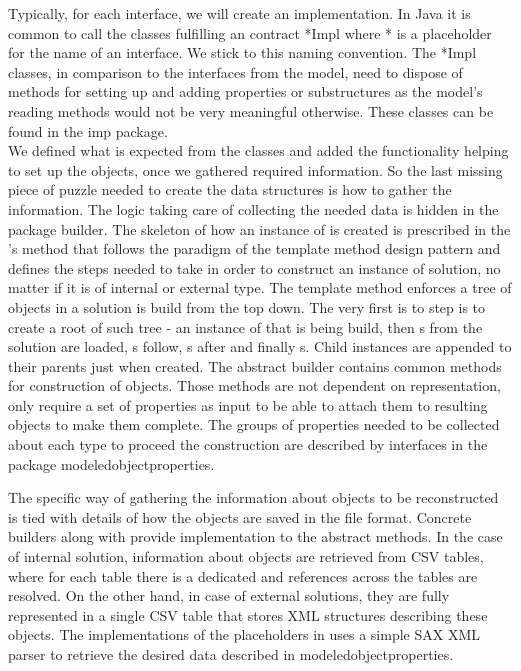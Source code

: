 Typically, for each interface, we will create an implementation. In Java it is common to call the classes fulfilling an contract *Impl where * is a placeholder for the name of an interface. We stick to this naming convention. 
The *Impl classes, in comparison to the interfaces from the model, need to dispose of methods for setting up and adding properties or substructures as the model's reading methods would not be very meaningful otherwise. These classes can be found in the imp package. \\

We defined what is expected from the classes and added the functionality helping to set up the objects, once we gathered required information. 
So the last missing piece of puzzle needed to create the data structures is how to gather the information.
The logic taking care of collecting the needed data is hidden in the package builder.
The skeleton of how an instance of  is created is prescribed in the 's method  that follows the paradigm of the template method design pattern and defines the steps needed to take in order to construct an instance of  solution, no matter if it is of internal or external type.
The template method enforces a tree of objects in a solution is build from the top down.
The very first is to step is to create a root of such tree - an instance of  that is being build, then s from the solution are loaded, s follow, s after and finally s. 
Child instances are appended to their parents just when created.
The abstract builder contains common methods for construction of objects. Those methods are not dependent on representation, only require a set of properties as input to be able to attach them to resulting objects to make them complete. The groups of properties needed to be collected about each type to proceed the construction are described by interfaces in the package modeledobjectproperties. 


The specific way of gathering the information about objects to be reconstructed is tied with details of how the objects are saved in the file format. Concrete builders 	 along with  provide implementation to the abstract methods.
In the case of internal solution, information about objects are retrieved from CSV tables, where for each table there is a dedicated and references across the tables are resolved.
On the other hand, in case of external solutions, they are fully represented in a single CSV table that stores XML structures describing these objects. The implementations of the placeholders in  uses a simple SAX XML parser to retrieve the desired data described in modeledobjectproperties.

